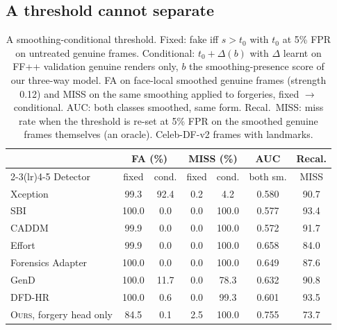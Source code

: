 \documentclass[conference]{IEEEtran}
\newcommand{\ours}{\textsc{Ours}}
\begin{document}
\subsection{A threshold cannot separate}
\label{sec:threshold}
\begin{table}[t]
\centering
\caption{A smoothing-conditional threshold. Fixed: fake iff $s>t_0$ with $t_0$ at 5\% FPR on untreated genuine frames.
Conditional: $t_0+\Delta(b)$ with $\Delta$ learnt on FF++ validation genuine renders only, $b$ the smoothing-presence score of
our three-way model. FA on face-local smoothed genuine frames (strength 0.12) and MISS on the same smoothing applied to
forgeries, fixed $\to$ conditional. AUC: both classes smoothed, same form. Recal.\ MISS: miss rate when the threshold is
re-set at 5\% FPR on the smoothed genuine frames themselves (an oracle). Celeb-DF-v2 frames with landmarks.}
\label{tab:bct}
\scriptsize
\setlength{\tabcolsep}{3pt}
\begin{tabular}{@{}l cc cc c c@{}}
\toprule
 & \multicolumn{2}{c}{FA (\%)} & \multicolumn{2}{c}{MISS (\%)} & AUC & Recal. \\
\cmidrule(lr){2-3}\cmidrule(lr){4-5}
Detector & fixed & cond. & fixed & cond. & both sm. & MISS \\
\midrule
Xception & 99.3 & 92.4 & 0.2 & 4.2 & 0.580 & 90.7 \\
SBI & 100.0 & 0.0 & 0.0 & 100.0 & 0.577 & 93.4 \\
CADDM & 99.9 & 0.0 & 0.0 & 100.0 & 0.572 & 91.7 \\
Effort & 99.9 & 0.0 & 0.0 & 100.0 & 0.658 & 84.0 \\
Forensics Adapter & 100.0 & 0.0 & 0.0 & 100.0 & 0.649 & 87.6 \\
GenD & 100.0 & 11.7 & 0.0 & 78.3 & 0.632 & 90.8 \\
DFD-HR & 100.0 & 0.6 & 0.0 & 99.3 & 0.601 & 93.5 \\
\ours{}, forgery head only & 84.5 & 0.1 & 2.5 & 100.0 & 0.755 & 73.7 \\
\bottomrule
\end{tabular}
\end{table}
\end{document}
